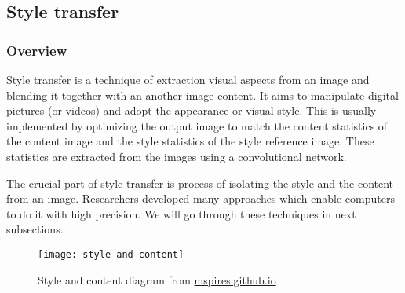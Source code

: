 \documentclass[../Main.tex]{subfiles}
\begin{document}
\subsection{Style transfer}

    \subsubsection{Overview}
    Style transfer is a technique of extraction visual aspects from an image and blending it together with an another image content. It aims to manipulate digital pictures (or videos) and adopt the appearance or visual style. This is usually implemented by optimizing the output image to match the content statistics of the content image and the style statistics of the style reference image. These statistics are extracted from the images using a convolutional network. 
    
    The crucial part of style transfer is process of isolating the style and the content from an image. Researchers developed many approaches which enable computers to do it with high precision. We will go through these techniques in next subsections. 
    \\
    \begin{figure}[h]
        \centering
        \texttt{[image: style-and-content]}
        \caption{Style and content diagram from \href{https://mspries.github.io/OpticalIllusionReportPage.html}{mspires.github.io}}
        \label{fig:style-and-content}
    \end{figure}
    
\end{document}
